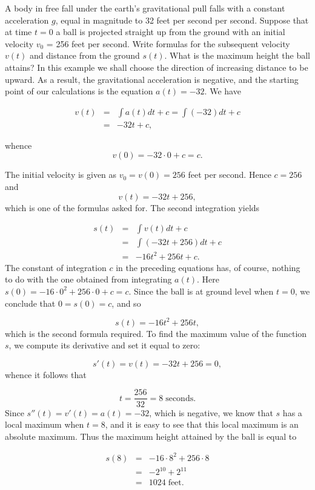 \begin{example} A body in free fall under the earth's gravitational pull falls with a constant acceleration $g$, equal in magnitude to 32 feet per second per second. Suppose that at time $t = 0$ a ball is projected straight up from the ground with an initial velocity $v_0$ = 256 feet per second. Write formulas for the subsequent velocity $v(t)$ and distance from the ground $s(t)$. What is the maximum height the ball attains? In this example we shall choose the direction of increasing distance to be upward. As a result, the gravitational acceleration is negative, and the starting point of our calculations is the equation $a(t) = - 32$. We have

\begin{eqnarray*}
v(t) &=& \int a(t) dt + c = \int (- 32) dt + c\\
     &=& -32t + c, 
\end{eqnarray*}

\noindent whence 
$$
v(0) = -32 \cdot 0 + c = c.
$$

\noindent The initial velocity is given as $v_0= v(0)= 256$ feet per second. Hence $c = 256$ and
$$
v(t) = -32t + 256,
$$
\noindent which is one of the formulas asked for. The second integration yields 

\begin{eqnarray*}
s(t) &=& \int v(t) dt + c \\
     &=& \int (-32t + 256) dt + c \\
     &=& - 16t^2 + 256t + c.
\end{eqnarray*}
\noindent The constant of integration $c$ in the preceding equations has, of course, nothing to do with the one obtained from integrating $a(t)$. Here $s(0) = -16 \cdot 0^{2} + 256 \cdot 0 + c = c$. Since the ball is at ground level when $t = 0$, we conclude that $0 = s(0) = c$, and so

$$
s(t) = - 16t^2 + 256t,
$$
\noindent which is the second formula required. To find the maximum value of the function $s$, we compute its derivative and set it equal to zero:

$$
s'(t) = v(t) = - 32t + 256 = 0,
$$
\noindent whence it follows that 

$$
t = \frac{256}{32} = 8 \;\mbox{seconds}.
$$
\noindent Since $s''(t) = v'(t) = a(t) = - 32$, which is negative, we know that $s$ has a local maximum when $t = 8$, and it is easy to see that this local maximum is an absolute maximum. Thus the maximum height attained by the ball is equal to

\begin{eqnarray*}
s(8) &=& -16 \cdot 8^2 + 256 \cdot 8 \\
     &=& - 2^{10} + 2^{11}\\
     &=& 1024 \;\mbox{feet}.
\end{eqnarray*}
\end{example}
\medskip


